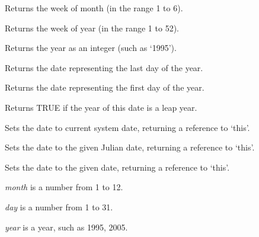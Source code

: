 
Returns the week of month (in the range 1 to 6).

\label{wxdategetweekofyear}


Returns the week of year (in the range 1 to 52).

\label{wxdategetyear}


Returns the year as an integer (such as `1995').

\label{wxdategetyearend}


Returns the date representing the last day of the year.

\label{wxdategetyearstart}


Returns the date representing the first day of the year.

\label{wxdateisleapyear}


Returns TRUE if the year of this date is a leap year.

\label{wxdateset}


Sets the date to current system date, returning a reference to `this'.


Sets the date to the given Julian date, returning a reference to `this'.


Sets the date to the given date, returning a reference to `this'.

{\it month} is a number from 1 to 12.

{\it day} is a number from 1 to 31.

{\it year} is a year, such as 1995, 2005.

\label{wxdatesetformat}


